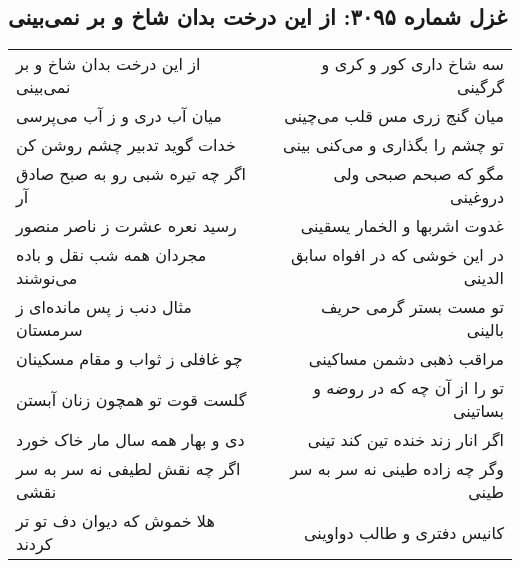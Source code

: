 \begin{center}
\section*{غزل شماره ۳۰۹۵: از این درخت بدان شاخ و بر نمی‌بینی}
\label{sec:3095}
\begin{longtable}{l p{0.5cm} r}
از این درخت بدان شاخ و بر نمی‌بینی
&&
سه شاخ داری کور و کری و گرگینی
\\
میان آب دری و ز آب می‌پرسی
&&
میان گنج زری مس قلب می‌چینی
\\
خدات گوید تدبیر چشم روشن کن
&&
تو چشم را بگذاری و می‌کنی بینی
\\
اگر چه تیره شبی رو به صبح صادق آر
&&
مگو که صبحم صبحی ولی دروغینی
\\
رسید نعره عشرت ز ناصر منصور
&&
غدوت اشربها و الخمار یسقینی
\\
مجردان همه شب نقل و باده می‌نوشند
&&
در این خوشی که در افواه سابق الدینی
\\
مثال دنب ز پس مانده‌ای ز سرمستان
&&
تو مست بستر گرمی حریف بالینی
\\
چو غافلی ز ثواب و مقام مسکینان
&&
مراقب ذهبی دشمن مساکینی
\\
گلست قوت تو همچون زنان آبستن
&&
تو را از آن چه که در روضه و بساتینی
\\
دی و بهار همه سال مار خاک خورد
&&
اگر انار زند خنده تین کند تینی
\\
اگر چه نقش لطیفی نه سر به سر نقشی
&&
وگر چه زاده طینی نه سر به سر طینی
\\
هلا خموش که دیوان دف تو تر کردند
&&
کانیس دفتری و طالب دواوینی
\\
\end{longtable}
\end{center}
